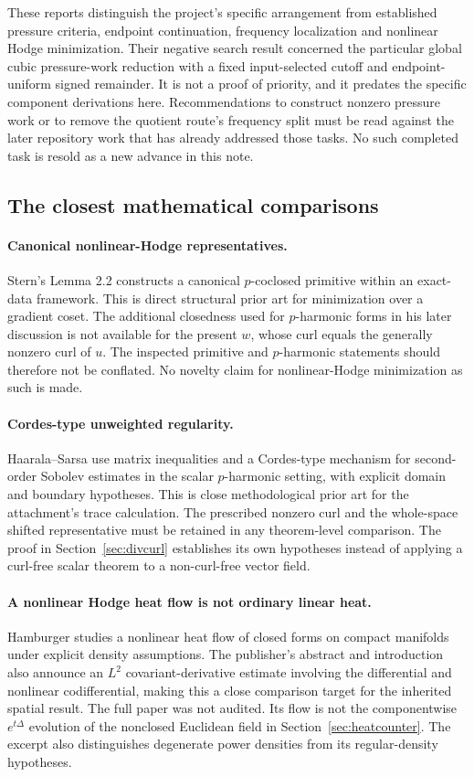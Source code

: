 \documentclass[11pt,a4paper]{article}
\theoremstyle{definition}
\theoremstyle{remark}
\numberwithin{equation}{section}
\begin{document}
These reports distinguish the project's specific arrangement from established pressure criteria, endpoint continuation, frequency localization and nonlinear Hodge minimization. Their negative search result concerned the particular global cubic pressure-work reduction with a fixed input-selected cutoff and endpoint-uniform signed remainder. It is not a proof of priority, and it predates the specific component derivations here. Recommendations to construct nonzero pressure work or to remove the quotient route's frequency split must be read against the later repository work that has already addressed those tasks. No such completed task is resold as a new advance in this note.

\subsection{The closest mathematical comparisons}
\paragraph{Canonical nonlinear-Hodge representatives.}
Stern's Lemma 2.2 \cite{Stern} constructs a canonical \(p\)-coclosed primitive within an exact-data framework. This is direct structural prior art for minimization over a gradient coset. The additional closedness used for \(p\)-harmonic forms in his later discussion is not available for the present \(w\), whose curl equals the generally nonzero curl of \(u\). The inspected primitive and \(p\)-harmonic statements should therefore not be conflated. No novelty claim for nonlinear-Hodge minimization as such is made.

\paragraph{Cordes-type unweighted regularity.}
Haarala--Sarsa \cite{HaaralaSarsa} use matrix inequalities and a Cordes-type mechanism for second-order Sobolev estimates in the scalar \(p\)-harmonic setting, with explicit domain and boundary hypotheses. This is close methodological prior art for the attachment's trace calculation. The prescribed nonzero curl and the whole-space shifted representative must be retained in any theorem-level comparison. The proof in Section~\ref{sec:divcurl} establishes its own hypotheses instead of applying a curl-free scalar theorem to a non-curl-free vector field.

\paragraph{A nonlinear Hodge heat flow is not ordinary linear heat.}
Hamburger \cite{Hamburger} studies a nonlinear heat flow of closed forms on compact manifolds under explicit density assumptions. The publisher's abstract and introduction also announce an \(L^2\) covariant-derivative estimate involving the differential and nonlinear codifferential, making this a close comparison target for the inherited spatial result. The full paper was not audited. Its flow is not the componentwise \(e^{t\Delta}\) evolution of the nonclosed Euclidean field in Section~\ref{sec:heatcounter}. The excerpt also distinguishes degenerate power densities from its regular-density hypotheses.
\end{document}

